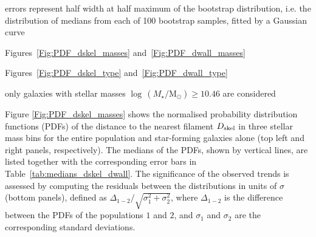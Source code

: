 \documentclass[useAMS,usenatbib]{mnras}
\newcommand{\Mstardot}{M\ensuremath{_{\star}} / \mathrm{M}\ensuremath{_{\odot}}}
\begin{document}
\begin{table*}
\begin{threeparttable}
\begin{tablenotes}
              errors represent half width at half maximum of the bootstrap distribution, i.e. the distribution of medians from each of 100 bootstrap samples, fitted by a Gaussian curve
     \item\label{tnote:mass_grad} Figures~\ref{Fig:PDF_dskel_masses} and~\ref{Fig:PDF_dwall_masses}                                       
     \item\label{tnote:type_grad} Figures~\ref{Fig:PDF_dskel_type} and~\ref{Fig:PDF_dwall_type}     
     \item\label{tnote:SF_passive} only galaxies with stellar masses  $\log \, (\Mstardot) \geq 10.46$ are considered
    \end{tablenotes}
\end{threeparttable}
\end{table*}

Figure \ref{Fig:PDF_dskel_masses} shows the normalised probability distribution functions (PDFs) of the distance to the nearest filament $D_{\rm skel}$ in three stellar mass bins for the entire population and star-forming galaxies alone (top left and right panels, respectively). 
The medians of the PDFs, shown by vertical lines, are listed together with the corresponding error bars in Table~\ref{tab:medians_dskel_dwall}.
The significance of the observed trends is assessed by computing the residuals between the distributions in units of $\sigma$ (bottom panels), defined as $\Delta_{1-2}/\sqrt{\sigma^2_1+\sigma^2_2}$, where $\Delta_{1-2}$ is the difference between the PDFs of the populations $1$ and $2$, and $\sigma_1$ and  $\sigma_2$ are the corresponding standard deviations. 
\end{document}
